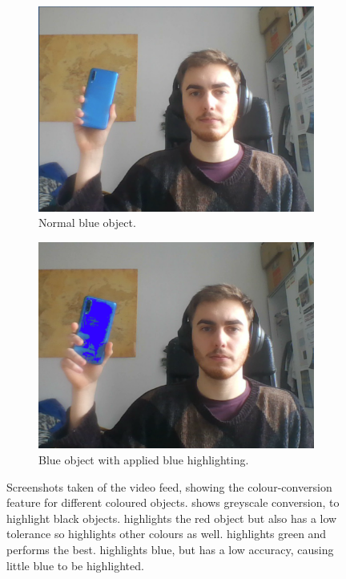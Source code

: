 \documentclass{l4proj}
\begin{document}
\begin{appendices}
\begin{figure}[!ht]
\begin{subfigure}{0.42\textwidth}
        \includegraphics[width=\textwidth]{images/colour-conversion-blue-before.pdf}
        \caption{Normal blue object.}
        \label{fig:colour-conversion-blue-before} 
    \end{subfigure}
    \begin{subfigure}{0.42\textwidth}
        \centering
        \includegraphics[width=\textwidth]{images/colour-conversion-blue-after.pdf}
        \caption{Blue object with applied blue highlighting.}
        \label{fig:colour-conversion-blue-after} 
    \end{subfigure}
    \caption{Screenshots taken of the video feed, showing the colour-conversion feature for different coloured objects.  shows greyscale conversion, to highlight black objects.  highlights the red object but also has a low tolerance so highlights other colours as well.  highlights green and performs the best.  highlights blue, but has a low accuracy, causing little blue to be highlighted.}
    \label{fig:colour-conversion}
\end{figure}



\end{appendices}
\end{document}
